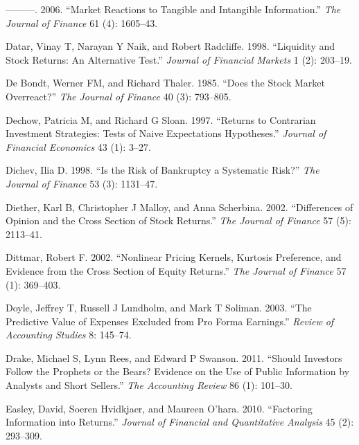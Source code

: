 \documentclass[
  letterpaper,
  DIV=11,
  numbers=noendperiod]{scrreprt}
\newlength{\cslhangindent}
\newlength{\cslentryspacingunit} %
\newenvironment{CSLReferences}[2] %
 {%
  \setlength{\parindent}{0pt}
  \ifodd #1
  \let\oldpar\par
  \def\par{\hangindent=\cslhangindent\oldpar}
  \fi
  \setlength{\parskip}{#2\cslentryspacingunit}
 }%
 {}
\begin{document}
\begin{CSLReferences}{1}{0}
\leavevmode{}%
---------. 2006. {``Market Reactions to Tangible and Intangible
Information.''} \emph{The Journal of Finance} 61 (4): 1605--43.

\leavevmode{}%
Datar, Vinay T, Narayan Y Naik, and Robert Radcliffe. 1998. {``Liquidity
and Stock Returns: An Alternative Test.''} \emph{Journal of Financial
Markets} 1 (2): 203--19.

\leavevmode{}%
De Bondt, Werner FM, and Richard Thaler. 1985. {``Does the Stock Market
Overreact?''} \emph{The Journal of Finance} 40 (3): 793--805.

\leavevmode{}%
Dechow, Patricia M, and Richard G Sloan. 1997. {``Returns to Contrarian
Investment Strategies: Tests of Naive Expectations Hypotheses.''}
\emph{Journal of Financial Economics} 43 (1): 3--27.

\leavevmode{}%
Dichev, Ilia D. 1998. {``Is the Risk of Bankruptcy a Systematic Risk?''}
\emph{The Journal of Finance} 53 (3): 1131--47.

\leavevmode{}%
Diether, Karl B, Christopher J Malloy, and Anna Scherbina. 2002.
{``Differences of Opinion and the Cross Section of Stock Returns.''}
\emph{The Journal of Finance} 57 (5): 2113--41.

\leavevmode{}%
Dittmar, Robert F. 2002. {``Nonlinear Pricing Kernels, Kurtosis
Preference, and Evidence from the Cross Section of Equity Returns.''}
\emph{The Journal of Finance} 57 (1): 369--403.

\leavevmode{}%
Doyle, Jeffrey T, Russell J Lundholm, and Mark T Soliman. 2003. {``The
Predictive Value of Expenses Excluded from Pro Forma Earnings.''}
\emph{Review of Accounting Studies} 8: 145--74.

\leavevmode{}%
Drake, Michael S, Lynn Rees, and Edward P Swanson. 2011. {``Should
Investors Follow the Prophets or the Bears? Evidence on the Use of
Public Information by Analysts and Short Sellers.''} \emph{The
Accounting Review} 86 (1): 101--30.

\leavevmode{}%
Easley, David, Soeren Hvidkjaer, and Maureen O'hara. 2010. {``Factoring
Information into Returns.''} \emph{Journal of Financial and Quantitative
Analysis} 45 (2): 293--309.


\end{CSLReferences}
\end{document}
